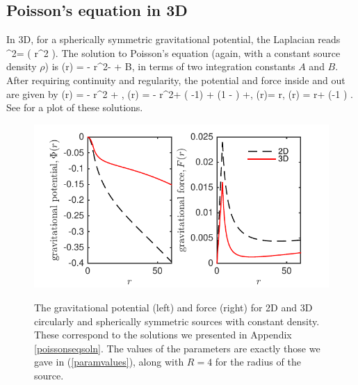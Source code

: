 \documentclass[a4paper, 12pt]{article}
\numberwithin{equation}{section}
\begin{document}
\subsection{Poisson's equation in 3D}
In 3D, for a spherically symmetric gravitational potential, the Laplacian reads
\bea
\nabla^2\Phi = \left( r^2 \right).
\eea
The solution to Poisson's equation (again, with a constant source density $\rho$) is 
\bea
\Phi(r) = -  r^2- + B,
\eea
in terms of two integration constants $A$ and $B$.   After requiring  continuity and regularity, the potential and force inside and out are given by
\bse
\label{poiss-soln-3}
\bea
{}(r) = -  r^2 + ,
\eea
\bea
{}(r) = -  r^2+  \left( -1\right) + \left(1 - \right)  +,
\eea
\ese
\bse
\label{poiss-soln-4}
\bea
{} (r)=   r,
\eea
\bea
{}(r) =  r+ \left(-1 \right)   .
\eea
\ese
See  for a plot of these solutions.

\begin{figure}[!t]
      \begin{center}
{\includegraphics[scale=1.4,angle=0]{images/rhoin_12_comps}}
      \end{center}
\caption{ The gravitational potential (left) and force (right) for 2D and 3D circularly and spherically symmetric sources with constant density. These correspond to the solutions we presented in Appendix \ref{poissonseqsoln}. The values of the parameters are exactly those we gave in (\ref{paramvalues}), along with $R=4$ for the radius of the source. }\label{fig:poisson_soln}
\end{figure}


\footnotesize{

}
\end{document}
